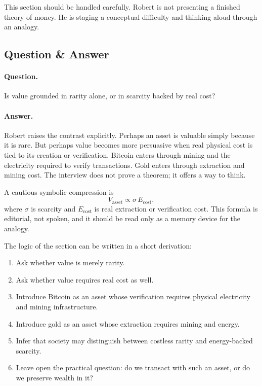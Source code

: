 This section should be handled carefully. Robert is not presenting a finished theory of money. He is staging a conceptual difficulty and thinking aloud through an analogy.

\subsection{Question \& Answer}

\paragraph{Question.}
Is value grounded in rarity alone, or in scarcity backed by real cost?

\paragraph{Answer.}
Robert raises the contrast explicitly. Perhaps an asset is valuable simply because it is rare. But perhaps value becomes more persuasive when real physical cost is tied to its creation or verification. Bitcoin enters through mining and the electricity required to verify transactions. Gold enters through extraction and mining cost. The interview does not prove a theorem; it offers a way to think.

A cautious symbolic compression is
\begin{equation}
V_{\text{asset}} \propto \sigma \, E_{\text{cost}},
\end{equation}
where \(\sigma\) is scarcity and \(E_{\text{cost}}\) is real extraction or verification cost. This formula is editorial, not spoken, and it should be read only as a memory device for the analogy.

The logic of the section can be written in a short derivation:
\begin{enumerate}
\item Ask whether value is merely rarity.
\item Ask whether value requires real cost as well.
\item Introduce Bitcoin as an asset whose verification requires physical electricity and mining infrastructure.
\item Introduce gold as an asset whose extraction requires mining and energy.
\item Infer that society may distinguish between costless rarity and energy-backed scarcity.
\item Leave open the practical question: do we transact with such an asset, or do we preserve wealth in it?
\end{enumerate}

